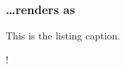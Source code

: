 \documentclass[mathserif]{beamer}%
\begin{document}
%
\begin{frame}[containsverbatim]%
\frametitle{{\dots}renders as}%
\begin{center}%
\begin{listingBlock}[0.8]{This is the listing caption.}%
\begin{scaledBox}{0.8\paperwidth}{!}%
\parbox{1.5\paperwidth}{%
%
}%
\end{scaledBox}%
\end{listingBlock}%
\end{center}%
\end{frame}%
%
%
\endPresentation%
%
\end{document}
